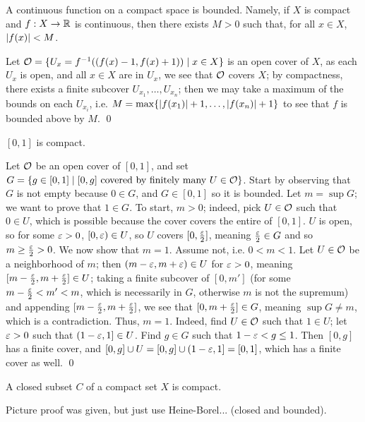 \newpage
\begin{simplethm}
    A continuous function on a compact space is bounded. Namely, if $X$ is compact and $f : X \to \mathbb R$ is continuous, then there exists $M > 0$ such that, for all $x \in X$, $\left\lvert f(x) \right\rvert < M$.
\end{simplethm}
\noindent Let $\mathcal O = \{U_x = f^{-1}((f(x) - 1, f(x) + 1)) \mid x \in X\}$ is an open cover of $X$, as each $U_x$ is open, and all $x \in X$ are in $U_x$, we see that $\mathcal O$ covers $X$; by compactness, there exists a finite subcover $U_{x_1}, \dots, U_{x_n}$; then we may take a maximum of the bounds on each $U_{x_i}$, i.e. $M = \max\{\left\lvert f(x_1) \right\rvert + 1, \dots, \left\lvert f(x_n) \right\rvert + 1\}$ to see that $f$ is bounded above by $M$. \qed
\begin{simplethm}
    $[0, 1]$ is compact.
\end{simplethm}
\noindent Let $\mathcal O$ be an open cover of $[0, 1]$, and set $G = \{ g \in [0, 1] \mid [0, g] \text{ covered by finitely many } U \\ \in \mathcal O\}$. Start by observing that $G$ is not empty because $0 \in G$, and $G \in [0, 1]$ so it is bounded. Let $m = \sup G$; we want to prove that $1 \in G$. To start, $m > 0$; indeed, pick $U \in \mathcal O$ such that $0 \in U$, which is possible because the cover covers the entire of $[0, 1]$. $U$ is open, so for some $\varepsilon > 0$, $[0, \varepsilon) \in U$, so $U$ covers $[0, \frac{\varepsilon}{2}]$, meaning $\frac{\varepsilon}{2} \in G$ and so $m \geq \frac{\varepsilon}{2} > 0$.
\medskip\newline
We now show that $m = 1$. Assume not, i.e. $0 < m < 1$. Let $U \in \mathcal O$ be a neighborhood of $m$; then $(m-\varepsilon, m+\varepsilon) \in U$ for $\varepsilon > 0$, meaning $[m-\frac{\varepsilon}{2}, m+\frac{\varepsilon}{2}] \in U$; taking a finite subcover of $[0, m']$ (for some $m - \frac{\varepsilon}{2} < m' < m$, which is necessarily in $G$, otherwise $m$ is not the supremum) and appending $[m - \frac{\varepsilon}{2}, m + \frac{\varepsilon}{2}]$, we see that $[0, m + \frac{\varepsilon}{2}] \in G$, meaning $\sup G \neq m$, which is a contradiction. Thus, $m = 1$.
\medskip\newline
Indeed, find $U \in \mathcal O$ such that $1 \in U$; let $\varepsilon > 0$ such that $(1 - \varepsilon, 1] \in U$. Find $g \in G$ such that $1 - \varepsilon < g \leq 1$. Then $[0, g]$ has a finite cover, and $[0, g] \cup U = [0, g] \cup (1 - \varepsilon, 1] = [0, 1]$, which has a finite cover as well. \qed
\begin{simplethm}
    A closed subset $C$ of a compact set $X$ is compact.
\end{simplethm}
\noindent Picture proof was given, but just use Heine-Borel... (closed and bounded).